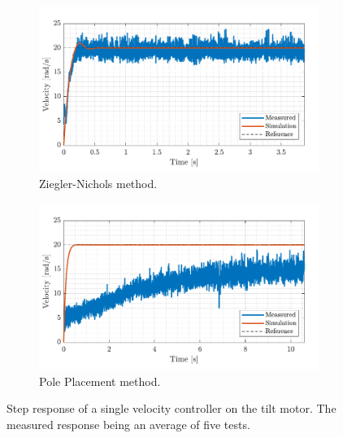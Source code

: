 \documentclass[../../main.tex]{subfiles}
\begin{document}
\begin{figure}[h]
     \centering
     \begin{subfigure}[b]{0.49\textwidth}
         \centering
         \includegraphics[width=\textwidth]{Sections/Test/Images/VelControllerTestZN.pdf}
         \caption{Ziegler-Nichols method.}
         \label{fig:StepVelZN}
     \end{subfigure}
     \hfill
     \begin{subfigure}[b]{0.49\textwidth}
         \centering
         \includegraphics[width=\textwidth]{Sections/Test/Images/VelControllerTestPP.pdf}
         \caption{Pole Placement method.}
         \label{fig:StepVelModel}
     \end{subfigure}
        \caption{Step response of a single velocity controller on the tilt motor. The measured response being an average of five tests.}
        \label{fig:VelocityTilt}
\end{figure}
\end{document}
